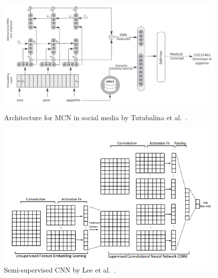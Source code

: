 \begin{figure}[h]
	\centering
	\begin{minipage}{0.45\textwidth}
		\includegraphics[width=0.99\linewidth]{Figures/f.png}
		\caption{Architecture for MCN in social media by Tutubalina et al.~\cite{TUTUBALINA201893}.}
		\label{fig:architecture-tutubalina}
	\end{minipage}
	\hfill
	\begin{minipage}{0.45\textwidth}
		\includegraphics[width=0.99\linewidth]{Figures/l.png}
		\caption{Semi-supervised CNN by Lee et al.~\cite{lee2017adverse}.}
		\label{fig:architecture-lee}
	\end{minipage}
\end{figure}

